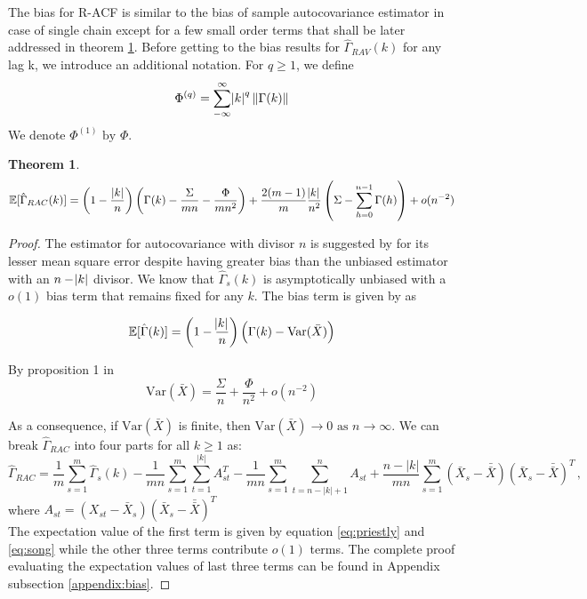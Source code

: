 \documentclass[11pt]{article}
\newcommand{\Var}{\text{Var}}
\newtheorem{theorem}{Theorem}
\theoremstyle{remark}
\begin{document}
The bias for R-ACF is similar to the bias of sample autocovariance estimator in case of single chain except for a few small order terms that shall be later addressed in theorem \ref{th:RAC_expec}. Before getting to the bias results for $\hat{\Gamma}_{RAV}(k)$ for any lag k, we introduce an additional notation. For $q \geq 1$, we define
\[
\Phi^{(q)} = \sum\limits_{-\infty}^{\infty}\abs{k}^q \|\Gamma(k)\|
\]
We denote $\Phi^{(1)} \textrm{ by } \Phi$. 
\begin{theorem} \label{th:RAC_expec}
   \[
   \mathbb{E}[\hat{\Gamma}_{RAC}(k)] = \left(1- \dfrac{|k|}{n}\right)\left(\Gamma(k) - \dfrac{\Sigma}{mn} - \dfrac{\Phi}{mn^2}\right)  + \dfrac{2(m-1)}{m}\dfrac{\abs{k}}{n^2} \left(\Sigma - \sum_{h=0}^{n-1}\Gamma(h)\right) + o(n^{-2})
   \]
\end{theorem}

\begin{proof}
 The estimator for autocovariance with divisor $n$ is suggested by \cite{parzen1961approach} for its lesser mean square error despite having greater bias than the unbiased estimator with an $n - \abs{k}$ divisor. 
 We know that $\hat{\Gamma}_s(k)$ is asymptotically unbiased with a $o(1)$ bias term that remains fixed for any $k$. The bias term is given by \cite{priestley1981spectral} as 
 
 \begin{equation} \label{eq:priestly}
     \mathbb{E}[\hat{\Gamma}(k)] = \left(1- \dfrac{\abs{k}}{n}\right)\left(\Gamma(k) - \Var{(\bar{X})}
 \right)
 \end{equation}
 
By proposition 1 in \cite{song1995optimal} 
\begin{equation} \label{eq:song}
\Var(\bar{X}) = \dfrac{\Sigma}{n} + \dfrac{\Phi}{n^2} + o(n^{-2})
\end{equation}

As a consequence, if $\Var(\bar{X})$ is finite, then $\Var(\bar{X}) \to 0 \textrm{ as } n \to \infty$. We can break $\hat{\Gamma}_{RAC}$ into four parts for all $k \geq 1$ as:
 \[
 \hat{\Gamma}_{RAC} =  \dfrac{1}{m}\sum_{s=1}^{m}\hat{\Gamma}_s(k) - \dfrac{1}{mn}\sum_{s=1}^{m}\sum_{t=1}^{|k|}A_{st}^T - \dfrac{1}{mn}\sum_{s=1}^{m}\sum_{t=n-|k|+1}^{n}A_{st} + \dfrac{n-|k|}{mn}\sum_{s=1}^{m}(\bar{X}_s - \bar{\bar{X}})(\bar{X}_s - \bar{\bar{X}})^T\,,
 \]
%
where $A_{st} = (X_{st}-\bar{X}_s)(\bar{X}_s - \bar{\bar{X}})^T$\\
The expectation value of the first term is given by equation \ref{eq:priestly} and \ref{eq:song} while the other three terms contribute $o(1)$ terms. The complete proof evaluating the expectation values of last three terms can be found in Appendix subsection \ref{appendix:bias}.
\end{proof}
\end{document}
